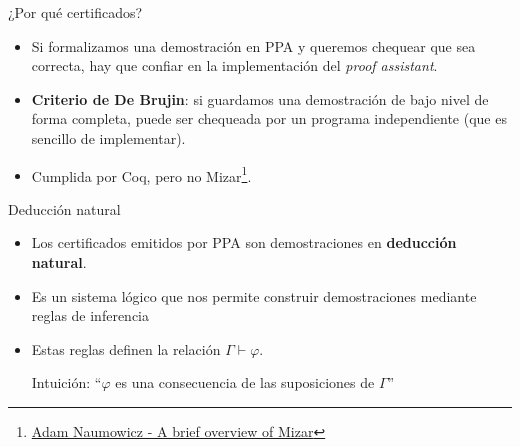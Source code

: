 \documentclass{beamer}
\begin{document}
\begin{frame}{¿Por qué certificados?}

    \begin{itemize}
        \item Si formalizamos una demostración en PPA y queremos chequear que sea correcta, hay que confiar en la implementación del \textit{proof assistant}.
        \item \textbf{Criterio de De Brujin}: si guardamos una demostración de bajo nivel de forma completa, puede ser chequeada por un programa independiente (que es sencillo de implementar).
        \item Cumplida por Coq, pero no Mizar\footnote{\href{https://www.researchgate.net/publication/225341870_A_Brief_Overview_of_Mizar}{Adam Naumowicz - A brief overview of Mizar}}.
    \end{itemize}

\end{frame}

\begin{frame}{Deducción natural}
    \begin{itemize}
        \item Los certificados emitidos por PPA son demostraciones en \textbf{deducción natural}.
        \item Es un sistema lógico que nos permite construir demostraciones mediante reglas de inferencia
        \item Estas reglas definen la relación $\Gamma \vdash \varphi$. 
        
        Intuición: ``$\varphi$ es una consecuencia de las suposiciones de $\Gamma$''
    \end{itemize}
\end{frame}
\end{document}
